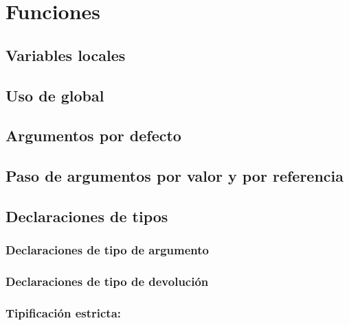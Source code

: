 \documentclass[a4paper,11pt,spanish]{sphinxmanual}
\begin{document}
\section{Funciones}
\label{\detokenize{php:funciones}}

\subsection{Variables locales}
\label{\detokenize{php:variables-locales}}

\subsection{Uso de global}
\label{\detokenize{php:uso-de-global}}

\subsection{Argumentos por defecto}
\label{\detokenize{php:argumentos-por-defecto}}

\subsection{Paso de argumentos por valor y por referencia}
\label{\detokenize{php:paso-de-argumentos-por-valor-y-por-referencia}}

\subsection{Declaraciones de tipos}
\label{\detokenize{php:declaraciones-de-tipos}}

\subsubsection{Declaraciones de tipo de argumento}
\label{\detokenize{php:declaraciones-de-tipo-de-argumento}}

\subsubsection{Declaraciones de tipo de devolución}
\label{\detokenize{php:declaraciones-de-tipo-de-devolucion}}

\subsubsection{Tipificación estricta: }
\label{\detokenize{php:tipificacion-estricta-declare-strict-types-1}}
\end{document}
